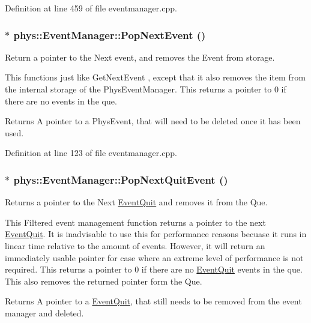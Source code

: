 Definition at line 459 of file eventmanager.cpp.

\hypertarget{classphys_1_1EventManager_ae403b203bc425744377ec5fc311f4e5d}{
\subsubsection[{PopNextEvent}]{ $\ast$ phys::EventManager::PopNextEvent ()}}
\label{da/dde/classphys_1_1EventManager_ae403b203bc425744377ec5fc311f4e5d}


Return a pointer to the Next event, and removes the Event from storage. 

This functions just like GetNextEvent , except that it also removes the item from the internal storage of the PhysEventManager. This returns a pointer to 0 if there are no events in the que. \begin{DoxyReturn}{Returns}
A pointer to a PhysEvent, that will need to be deleted once it has been used. 
\end{DoxyReturn}


Definition at line 123 of file eventmanager.cpp.

\hypertarget{classphys_1_1EventManager_a9b0d8e4d76fef35423bb862d7127b747}{
\subsubsection[{PopNextQuitEvent}]{ $\ast$ phys::EventManager::PopNextQuitEvent ()}}
\label{da/dde/classphys_1_1EventManager_a9b0d8e4d76fef35423bb862d7127b747}


Returns a pointer to the Next \hyperlink{classphys_1_1EventQuit}{EventQuit} and removes it from the Que. 

This Filtered event management function returns a pointer to the next \hyperlink{classphys_1_1EventQuit}{EventQuit}. It is inadvisable to use this for performance reasons becuase it runs in linear time relative to the amount of events. However, it will return an immediately usable pointer for case where an extreme level of performance is not required. This returns a pointer to 0 if there are no \hyperlink{classphys_1_1EventQuit}{EventQuit} events in the que. This also removes the returned pointer form the Que. \begin{DoxyReturn}{Returns}
A pointer to a \hyperlink{classphys_1_1EventQuit}{EventQuit}, that still needs to be removed from the event manager and deleted. 
\end{DoxyReturn}


